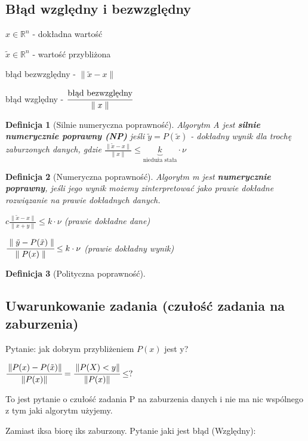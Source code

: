 \documentclass[hidelinks,a4paper]{article}
\newcommand{\RR}{\mathbb{R}}
\newcommand{\norm}[1]{\left\lVert#1\right\rVert}
\newtheorem{defi}{Definicja}
\begin{document}
\subsection{Błąd względny i bezwzględny}
$x \in \RR^n$ - dokładna wartość

$\tilde{x} \in \RR^n$ - wartość przybliżona

błąd bezwzględny - $\parallel \tilde{x} - x \parallel$

błąd względny - $\cfrac{\textrm{błąd bezwzględny}}{\parallel x \parallel}$

\begin{defi}[Silnie numeryczna poprawność]
	Algorytm A jest \textbf{silnie numerycznie poprawny (NP)} jeśli $\tilde{y} = P(\tilde{x})$ - dokładny wynik dla trochę zaburzonych danych, gdzie $\frac{\parallel \tilde{x} - x\parallel}{\parallel x \parallel} \leq \underbrace{k}_{\textrm{nieduża stała}} \cdot \nu$
\end{defi}

\begin{defi}[Numeryczna poprawność]
	Algorytm m jest \textbf{numerycznie poprawny}, jeśli jego wynik możemy zinterpretować jako prawie dokładne rozwiązanie na prawie dokładnych danych.
	
	$c\frac{\parallel \tilde{x} - x \parallel}{\parallel x + y \parallel} \leq k \cdot \nu$ (prawie dokładne dane)
	
	$\cfrac{\parallel \tilde{y} - P(\tilde{x}) \parallel}{\parallel P(x) \parallel} \leq k \cdot \nu$ (prawie dokładny wynik)
	
\end{defi}

\begin{defi}[Polityczna poprawność]\end{defi}

\subsection{Uwarunkowanie zadania (czułość zadania na zaburzenia)}

Pytanie: jak dobrym przybliżeniem $P(x)$ jest y? 

$\cfrac{\norm{P(x) - P(\tilde{x})}}{\norm{P(x)}} = \cfrac{\norm{P(X) < y}}{\norm{P(x)}} \leq ?$

To jest pytanie o czułość zadania P na zaburzenia danych i nie ma nic wspólnego z tym jaki algorytm użyjemy.


Zamiast iksa biorę iks zaburzony. Pytanie jaki jest błąd (Względny):
\end{document}
